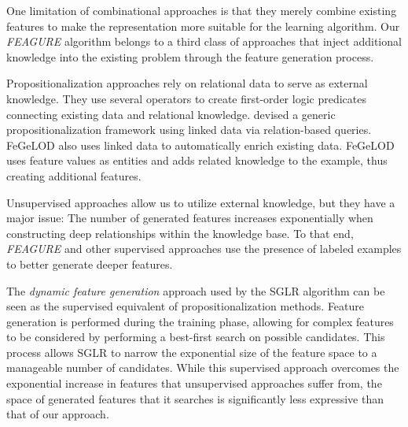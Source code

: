 \documentclass[letterpaper]{article} %
\theoremstyle{definition}
\begin{document}
One limitation of combinational approaches is that they merely combine existing features to make the representation more suitable for the 
learning algorithm. 
Our \emph{FEAGURE} algorithm belongs to a third class of approaches that inject additional knowledge into the existing problem through the feature generation process.

Propositionalization approaches  rely on relational data to serve as external knowledge. They use several operators to create first-order logic predicates connecting existing data and relational knowledge. 
\citeauthor{cheng2011automatedfull} devised a generic propositionalization framework  using linked data via relation-based queries. 
FeGeLOD \cite{paulheim2012unsupervisedfull} also uses linked data to automatically enrich existing data. 
FeGeLOD uses feature values as entities and adds related knowledge to the example,
thus creating additional features.

Unsupervised approaches allow us to utilize external knowledge, but they have a major issue: 
The number of generated features increases exponentially when constructing deep relationships within the knowledge base.
To that end, \emph{FEAGURE} and other supervised approaches use the presence of labeled examples to better generate deeper features.


The \emph{dynamic feature generation} approach used by the SGLR algorithm \cite{popescul200716} can be seen as the supervised equivalent of propositionalization methods. Feature generation
is performed during the training phase, allowing for complex features to be considered by
performing a best-first search on possible candidates. This process allows SGLR to narrow the
exponential size of the feature space to a manageable number of candidates. While this supervised
approach overcomes the exponential increase in features that unsupervised approaches suffer
from, the space of generated features that it searches is significantly less expressive than that of our
approach. %
\end{document}
